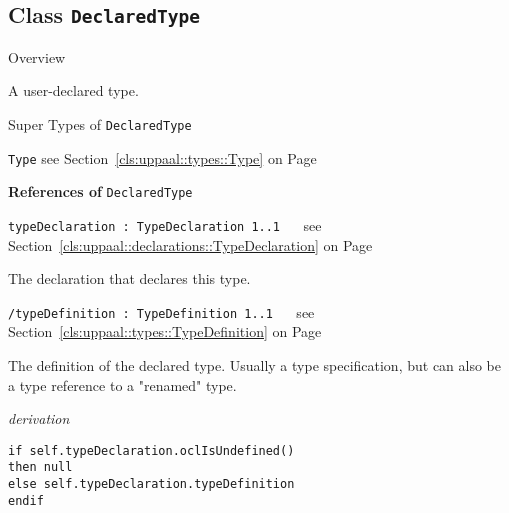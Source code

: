	

\subsection{Class \bfseries \texttt{DeclaredType}\normalfont}
\label{cls:uppaal::types::DeclaredType} 
	
	\begin{longdescription}
		\item[Overview] 		
				

	

		A user-declared type.		
		\item[Super Types of \texttt{DeclaredType}] ~
			\begin{longdescription}
				\item[\texttt{Type}] see Section~\ref{cls:uppaal::types::Type} on Page~\pageref{cls:uppaal::types::Type}						\end{longdescription}
		
	
			\item[\textbf{References of} \texttt{DeclaredType}] ~
			\begin{longdescription}
	\item[\texttt{typeDeclaration : TypeDeclaration 	\symbol{"5B}1..1\symbol{"5D}
}] ~
	see Section~\ref{cls:uppaal::declarations::TypeDeclaration} on Page~\pageref{cls:uppaal::declarations::TypeDeclaration}
	
	\nopagebreak
		
				

	

		The declaration that declares this type.		
	\item[\texttt{/typeDefinition : TypeDefinition 	\symbol{"5B}1..1\symbol{"5D}
}] ~
	see Section~\ref{cls:uppaal::types::TypeDefinition} on Page~\pageref{cls:uppaal::types::TypeDefinition}
	
	\nopagebreak
		
				

	

		The definition of the declared type. Usually a type specification, but can also be a type reference to a "renamed" type.		
		\begin{longdescription}
	\item[\small\textit{derivation}] ~ 
	\nopagebreak
		\begin{lstlisting}[language=OCL, breaklines=true]
if self.typeDeclaration.oclIsUndefined()
then null
else self.typeDeclaration.typeDefinition
endif		\end{lstlisting}
		\end{longdescription}
			\end{longdescription}
	
	\end{longdescription}
	

